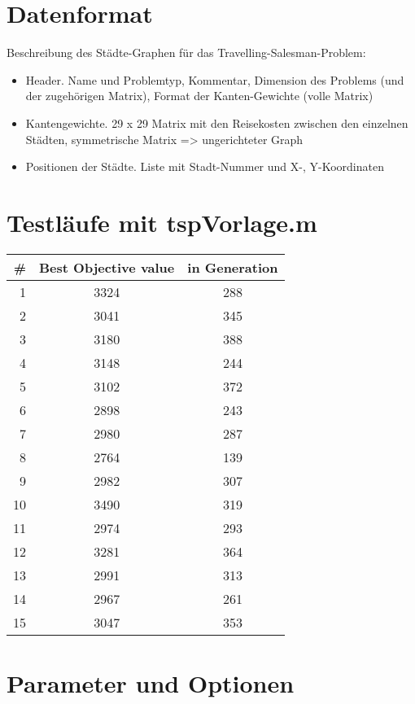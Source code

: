 \section{Datenformat}

\cite{default}

\noindent Beschreibung des Städte-Graphen für das Travelling-Salesman-Problem:

\begin{itemize}
  \item Header. Name und Problemtyp, Kommentar, Dimension des Problems (und der zugehörigen Matrix), Format der Kanten-Gewichte (volle Matrix)
  \item Kantengewichte. 29 x 29 Matrix mit den Reisekosten zwischen den einzelnen Städten, symmetrische Matrix => ungerichteter Graph
  \item Positionen der Städte. Liste mit Stadt-Nummer und X-, Y-Koordinaten
\end{itemize}


\section{Testläufe mit tspVorlage.m}

\begin{tabular}{ | r | c | c | }
  \hline
  \# & Best Objective value & in Generation \\
  \hline
  1  & 3324 & 288 \\
  2  & 3041 & 345 \\
  3  & 3180 & 388 \\
  4  & 3148 & 244 \\
  5  & 3102 & 372 \\
  6  & 2898 & 243 \\
  7  & 2980 & 287 \\
  8  & 2764 & 139 \\
  9  & 2982 & 307 \\
  10 & 3490 & 319 \\
  11 & 2974 & 293 \\
  12 & 3281 & 364 \\
  13 & 2991 & 313 \\
  14 & 2967 & 261 \\
  15 & 3047 & 353 \\
  \hline
\end{tabular}


\section{Parameter und Optionen}

